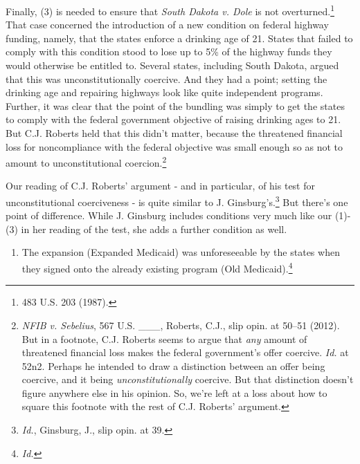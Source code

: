 \documentclass[
  11pt,
  letterpaper,
  DIV=11,
  numbers=noendperiod,
  twoside]{scrartcl}
\providecommand{\tightlist}{%
  \setlength{\itemsep}{0pt}\setlength{\parskip}{0pt}}
\begin{document}
Finally, (3) is needed to ensure that \emph{South Dakota v. Dole} is not
overturned.\footnote{483 U.S. 203 (1987).} That case concerned the
introduction of a new condition on federal highway funding, namely, that
the states enforce a drinking age of 21. States that failed to comply
with this condition stood to lose up to 5\% of the highway funds they
would otherwise be entitled to. Several states, including South Dakota,
argued that this was unconstitutionally coercive. And they had a point;
setting the drinking age and repairing highways look like quite
independent programs. Further, it was clear that the point of the
bundling was simply to get the states to comply with the federal
government objective of raising drinking ages to 21. But C.J. Roberts
held that this didn't matter, because the threatened financial loss for
noncompliance with the federal objective was small enough so as not to
amount to unconstitutional coercion.\footnote{\emph{NFIB v. Sebelius},
  567 U.S. \_\_\_, Roberts, C.J., slip opin. at 50--51 (2012). But in a
  footnote, C.J. Roberts seems to argue that \emph{any} amount of
  threatened financial loss makes the federal government's offer
  coercive. \emph{Id.} at 52n2. Perhaps he intended to draw a
  distinction between an offer being coercive, and it being
  \emph{unconstitutionally} coercive. But that distinction doesn't
  figure anywhere else in his opinion. So, we're left at a loss about
  how to square this footnote with the rest of C.J. Roberts' argument.}

Our reading of C.J. Roberts' argument - and in particular, of his test
for unconstitutional coerciveness - is quite similar to J.
Ginsburg's.\footnote{\emph{Id.}, Ginsburg, J., slip opin. at 39.} But
there's one point of difference. While J. Ginsburg includes conditions
very much like our (1)-(3) in her reading of the test, she adds a
further condition as well.

\begin{enumerate}
\def\labelenumi{\arabic{enumi}.}
\setcounter{enumi}{3}
\tightlist
\item
  The expansion (Expanded Medicaid) was unforeseeable by the states when
  they signed onto the already existing program (Old
  Medicaid).\footnote{\emph{Id.}}
\end{enumerate}
\end{document}
